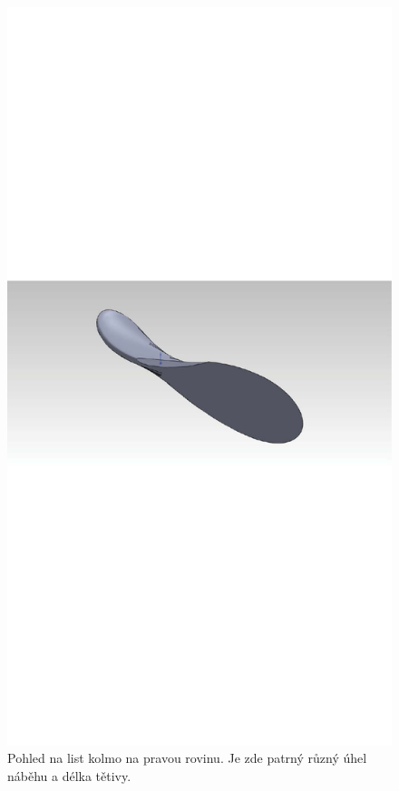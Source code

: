 	\begin{figure}[H]
					\centering
					\includegraphics[]{obrazky/rotor/list2p}
					\caption{Pohled na list kolmo na pravou rovinu. Je zde patrný různý úhel náběhu a délka tětivy.}
					\label{obr.model2}
		\end{figure}
